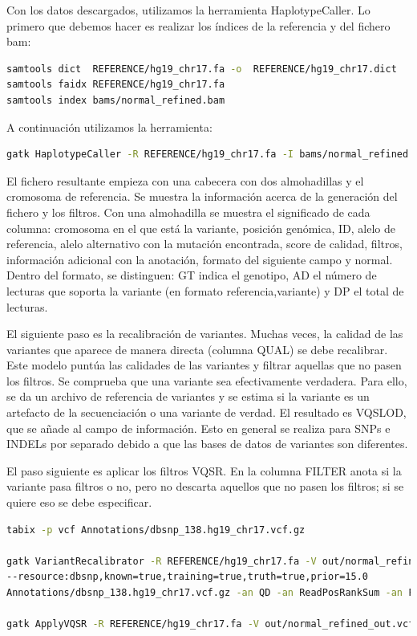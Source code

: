 Con los datos descargados, utilizamos la herramienta HaplotypeCaller. Lo primero que debemos hacer es realizar los índices de la referencia y del fichero bam:
\begin{lstlisting}[language=bash]
samtools dict  REFERENCE/hg19_chr17.fa -o  REFERENCE/hg19_chr17.dict
samtools faidx REFERENCE/hg19_chr17.fa
samtools index bams/normal_refined.bam
\end{lstlisting}

A continuación utilizamos la herramienta:
\begin{lstlisting}[language=bash]
gatk HaplotypeCaller -R REFERENCE/hg19_chr17.fa -I bams/normal_refined.bam -O out/normal_refined_out.vcf
\end{lstlisting}

El fichero resultante empieza con una cabecera con dos almohadillas y el cromosoma de referencia. Se muestra la información acerca de la generación del fichero y los filtros. Con una almohadilla se muestra el significado de cada columna: cromosoma en el que está la variante, posición genómica, ID, alelo de referencia, alelo alternativo con la mutación encontrada, score de calidad, filtros, información adicional con la anotación, formato del siguiente campo y normal. Dentro del formato, se distinguen: GT indica el genotipo, AD el número de lecturas que soporta la variante (en formato referencia,variante) y DP el total de lecturas.

El siguiente paso es la recalibración de variantes. Muchas veces, la calidad de las variantes que aparece de manera directa (columna QUAL) se debe recalibrar. Este modelo puntúa las calidades de las variantes y filtrar aquellas que no pasen los filtros. Se comprueba que una variante sea efectivamente verdadera. Para ello, se da un archivo de referencia de variantes y se estima si la variante es un artefacto de la secuenciación o una variante de verdad. El resultado es VQSLOD, que se añade al campo de información. Esto en general se realiza para SNPs e INDELs por separado debido a que las bases de datos de variantes son diferentes. 

El paso siguiente es aplicar los filtros VQSR. En la columna FILTER anota si la variante pasa filtros o no, pero no descarta aquellos que no pasen los filtros; si se quiere eso se debe especificar.
\begin{lstlisting}[language=bash]
tabix -p vcf Annotations/dbsnp_138.hg19_chr17.vcf.gz

gatk VariantRecalibrator -R REFERENCE/hg19_chr17.fa -V out/normal_refined_out.vcf
--resource:dbsnp,known=true,training=true,truth=true,prior=15.0
Annotations/dbsnp_138.hg19_chr17.vcf.gz -an QD -an ReadPosRankSum -an FS -an SOR -mode BOTH -O out/output_normal_refined.recal --tranches-file out/output_normal_refined.tranches

gatk ApplyVQSR -R REFERENCE/hg19_chr17.fa -V out/normal_refined_out.vcf -O out/output_normal_refined.recalibrated --truth-sensitivity-filter-level 99.0 --tranches-file out/output_normal_refined.tranches --recal-file out/output_normal_refined.recal -mode BOTH
\end{lstlisting}
